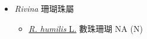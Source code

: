 
  \begin{itemize}
 \item[] \textit{Rivina} 珊瑚珠屬
                                
  \begin{itemize}
        \item[] \href{http://www.theplantlist.org/tpl1.1/search?q=Rivina+humilis}{\textit{R. humilis} L.}   數珠珊瑚   NA (N)
  \end{itemize}
  \end{itemize}
